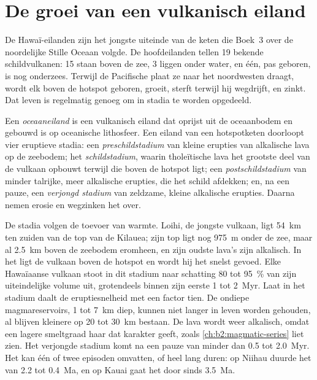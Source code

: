\section{De groei van een vulkanisch eiland}\label{sec:b2:oceanic-islands:growth}

De Hawaï-eilanden zijn het jongste uiteinde van de keten die Boek~3 over de
noordelijke Stille Oceaan volgde. De hoofdeilanden tellen 19 bekende schildvulkanen: 15 staan boven de zee,
3 liggen onder water, en één, pas geboren, is nog onderzees. Terwijl de Pacifische plaat ze naar het
noordwesten draagt, wordt elk boven de hotspot geboren, groeit, sterft terwijl hij wegdrijft, en zinkt. Dat leven is
regelmatig genoeg om in stadia te worden opgedeeld.

\begin{definition}\label{def:b2:oceanic-islands:stages}
Een \emph{oceaaneiland} is een vulkanisch eiland dat oprijst uit de
oceaanbodem en gebouwd is op oceanische lithosfeer. Een eiland van een hotspotketen doorloopt vier eruptieve
stadia: een \emph{preschildstadium} van kleine erupties van alkalische lava op de zeebodem; het
\emph{schildstadium}, waarin tholeïtische lava het grootste deel van de vulkaan opbouwt
terwijl die boven de hotspot ligt; een \emph{postschildstadium} van minder talrijke, meer alkalische erupties,
die het schild afdekken; en, na een pauze, een \emph{verjongd stadium} van zeldzame, kleine alkalische
erupties. Daarna nemen erosie en wegzinken het over.
\end{definition}

De stadia volgen de toevoer van warmte. Loihi, de jongste vulkaan, ligt \qty{54}{km} ten zuiden van de
top van de Kilauea; zijn top ligt nog \qty{975}{m} onder de zee, maar al \qty{2.5}{km} boven de
zeebodem eromheen, en zijn oudste lava's zijn alkalisch. In het  ligt de vulkaan boven
de hotspot en wordt hij het snelst gevoed. Elke Hawaïaanse vulkaan stoot in dit stadium naar schatting 80 tot
\qty{95}{\percent} van zijn uiteindelijke volume uit, grotendeels binnen zijn eerste 1 tot \qty{2}{Myr}.
Laat in het stadium daalt de eruptiesnelheid met een factor tien. De ondiepe magmareservoirs, 1
tot \qty{7}{km} diep, kunnen niet langer in leven worden gehouden, al blijven kleinere op 20 tot \qty{30}{km}
bestaan. De lava wordt weer alkalisch, omdat een lagere smeltgraad haar dat karakter geeft, zoals
\cref{ch:b2:magmatic-series} liet zien. Het verjongde stadium komt na een pauze van minder dan 0.5
tot \qty{2.0}{Myr}. Het kan één of twee episoden omvatten, of heel lang duren: op Niihau duurde het van 2.2 tot
\qty{0.4}{Ma}, en op Kauai gaat het door sinds \qty{3.5}{Ma}.

